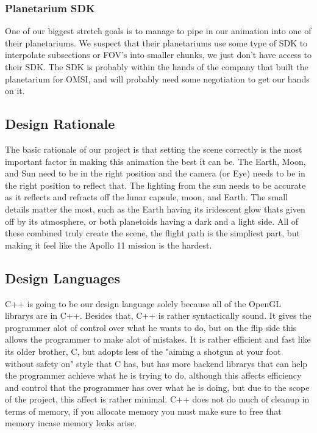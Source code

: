 \documentclass[onecolumn, draftclsnofoot,10pt, compsoc]{IEEEtran}
\begin{document}
	\subsubsection{Planetarium SDK}
	One of our biggest stretch goals is to manage to pipe in our animation into one of their planetariums. We suspect that their planetariums use some type of SDK to interpolate subsections or FOV's into smaller chunks, we just don't have access to their SDK. The SDK is probably within the hands of the company that built the planetarium for OMSI, and will probably need some negotiation to get our hands on it. 
    
    \subsection{Design Rationale}
	The basic rationale of our project is that setting the scene correctly is the most important factor in making this animation the best it can be. The Earth, Moon, and Sun need to be in the right position and the camera (or Eye) needs to be in the right position to reflect that. The lighting from the sun needs to be accurate as it reflects and refracts off the lunar capsule, moon, and Earth. The small details matter the most, such as the Earth having its iridescent glow thats given off by its atmosphere, or both planetoids having a dark and a light side. All of these combined truly create the scene, the flight path is the simpliest part, but making it feel like the Apollo 11 mission is the hardest.
    \subsection{Design Languages}
	C++ is going to be our design language solely because all of the OpenGL librarys are in C++. Besides that, C++ is rather syntactically sound. It gives the programmer alot of control over what he wants to do, but on the flip side this allows the programmer to make alot of mistakes. It is rather efficient and fast like its older brother, C, but adopts less of the "aiming a shotgun at your foot without safety on" style that C has, but has more backend librarys that can help the programmer achieve what he is trying to do, although this affects efficiency and control that the programmer has over what he is doing, but due to the scope of the project, this affect is rather minimal. C++ does not do much of cleanup in terms of memory, if you allocate memory you must make sure to free that memory incase memory leaks arise. 
\end{document}

